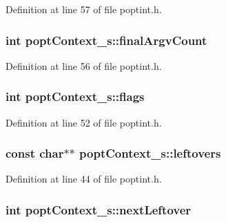 Definition at line 57 of file poptint.\+h.

\hypertarget{structpopt_context__s_a0c5a151e184bf3996af518c7c1a9fdbd}{}
\subsubsection[{final\+Argv\+Count}]{\setlength{\rightskip}{0pt plus 5cm}int popt\+Context\+\_\+s\+::final\+Argv\+Count}\label{structpopt_context__s_a0c5a151e184bf3996af518c7c1a9fdbd}


Definition at line 56 of file poptint.\+h.

\hypertarget{structpopt_context__s_a62495f10b1c05f6ac186b5925b048a8f}{}
\subsubsection[{flags}]{\setlength{\rightskip}{0pt plus 5cm}int popt\+Context\+\_\+s\+::flags}\label{structpopt_context__s_a62495f10b1c05f6ac186b5925b048a8f}


Definition at line 52 of file poptint.\+h.

\hypertarget{structpopt_context__s_a132c28f3847ded144880e1b1ee4231a7}{}
\subsubsection[{leftovers}]{\setlength{\rightskip}{0pt plus 5cm}const char$\ast$$\ast$ popt\+Context\+\_\+s\+::leftovers}\label{structpopt_context__s_a132c28f3847ded144880e1b1ee4231a7}


Definition at line 44 of file poptint.\+h.

\hypertarget{structpopt_context__s_a217a5349eaed3f52683f2b8fa751e3e0}{}
\subsubsection[{next\+Leftover}]{\setlength{\rightskip}{0pt plus 5cm}int popt\+Context\+\_\+s\+::next\+Leftover}\label{structpopt_context__s_a217a5349eaed3f52683f2b8fa751e3e0}


